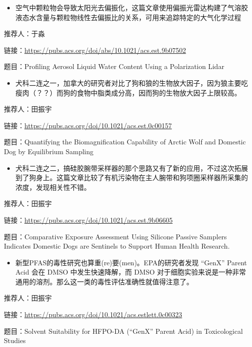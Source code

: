 \documentclass[
]{book}
\providecommand{\tightlist}{%
  \setlength{\itemsep}{0pt}\setlength{\parskip}{0pt}}
\begin{document}
\begin{itemize}
\tightlist
\item
  空气中颗粒物会导致太阳光去偏振化，这篇文章使用偏振光雷达构建了气溶胶液态水含量与颗粒物线性去偏振比的关系，可用来追踪特定的大气化学过程
\end{itemize}

推荐人：于淼

链接：\url{https://pubs.acs.org/doi/abs/10.1021/acs.est.9b07502}

题目：Profiling Aerosol Liquid Water Content Using a Polarization Lidar

\begin{itemize}
\tightlist
\item
  犬科二连之一，加拿大的研究者对比了狗和狼的生物放大因子，因为狼主要吃瘦肉（？？）而狗的食物中脂类成分高，因而狗的生物放大因子上限较高。
\end{itemize}

推荐人：田振宇

链接：\url{https://pubs.acs.org/doi/10.1021/acs.est.0c00157}

题目：Quantifying the Biomagnification Capability of Arctic Wolf and Domestic Dog by Equilibrium Sampling

\begin{itemize}
\tightlist
\item
  犬科二连之二，搞硅胶腕带采样器的那个思路又有了新的应用，不过这次拓展到了狗身上。这篇文章比较了有机污染物在主人腕带和狗项圈采样器所采集的浓度，发现相关性不错。
\end{itemize}

推荐人：田振宇

链接：\url{https://pubs.acs.org/doi/10.1021/acs.est.9b06605}

题目：Comparative Exposure Assessment Using Silicone Passive Samplers Indicates Domestic Dogs are Sentinels to Support Human Health Research.

\begin{itemize}
\tightlist
\item
  新型PFAS的毒性研究也算重(re)要(men)。EPA的研究者发现 ``GenX'' Parent Acid 会在 DMSO 中发生快速降解，而 DMSO 对于细胞实验来说是一种非常通用的溶剂。那么这一类的毒性评估准确性就值得注意了。
\end{itemize}

推荐人：田振宇

链接：\url{https://pubs.acs.org/doi/10.1021/acs.estlett.0c00323}

题目：Solvent Suitability for HFPO-DA (``GenX'' Parent Acid) in Toxicological Studies
\end{document}
